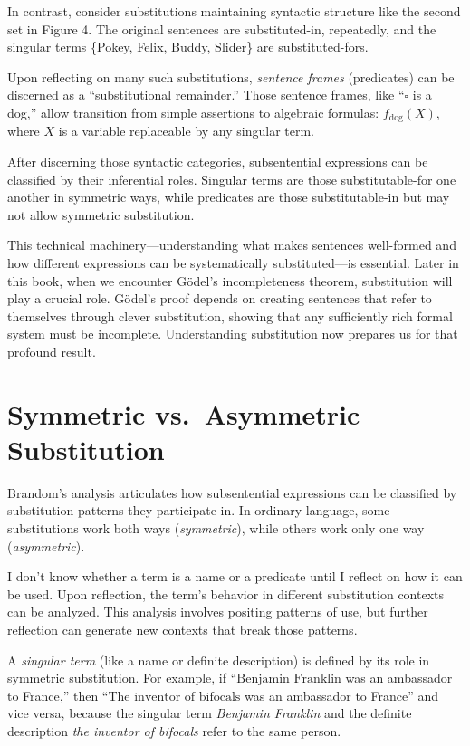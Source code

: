 \documentclass[12pt]{book}
\begin{document}
In contrast, consider substitutions maintaining syntactic structure like the second set in Figure 4. The original sentences are substituted-in, repeatedly, and the singular terms \{Pokey, Felix, Buddy, Slider\} are substituted-fors.

Upon reflecting on many such substitutions, \emph{sentence frames} (predicates) can be discerned as a ``substitutional remainder.'' Those sentence frames, like ``\(\square\) is a dog,'' allow transition from simple assertions to algebraic formulas: \(f_{\text{dog}}(X)\), where \(X\) is a variable replaceable by any singular term.

After discerning those syntactic categories, subsentential expressions can be classified by their inferential roles. Singular terms are those substitutable-for one another in symmetric ways, while predicates are those substitutable-in but may not allow symmetric substitution.

This technical machinery---understanding what makes sentences well-formed and how different expressions can be systematically substituted---is essential. Later in this book, when we encounter Gödel's incompleteness theorem, substitution will play a crucial role. Gödel's proof depends on creating sentences that refer to themselves through clever substitution, showing that any sufficiently rich formal system must be incomplete. Understanding substitution now prepares us for that profound result.

\section{Symmetric vs.~Asymmetric Substitution}\label{symmetric-vs.-asymmetric-substitution}

Brandom's analysis \parencite*[Ch. 4]{Brandom2000} articulates how subsentential expressions can be classified by substitution patterns they participate in. In ordinary language, some substitutions work both ways (\emph{symmetric}), while others work only one way (\emph{asymmetric}).

I don't know whether a term is a name or a predicate until I reflect on how it can be used. Upon reflection, the term's behavior in different substitution contexts can be analyzed. This analysis involves positing patterns of use, but further reflection can generate new contexts that break those patterns.

A \emph{singular term} (like a name or definite description) is defined by its role in symmetric substitution. For example, if ``\(\text{Benjamin Franklin}\) was an ambassador to France,'' then ``\(\text{The inventor of bifocals}\) was an ambassador to France'' and vice versa, because the singular term \emph{Benjamin Franklin} and the definite description \emph{the inventor of bifocals} refer to the same person.
\end{document}
